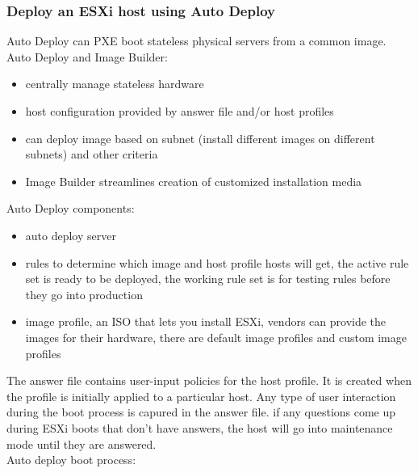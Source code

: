 \subsubsection{Deploy an ESXi host using Auto Deploy}

Auto Deploy can PXE boot stateless physical servers from a common image.\\

Auto Deploy and Image Builder:

\begin{itemize}
\item centrally manage stateless hardware
\item host configuration provided by answer file and/or host profiles
\item can deploy image based on subnet (install different images on different
subnets) and other criteria
\item Image Builder streamlines creation of customized installation media
\end{itemize}

Auto Deploy components:

\begin{itemize}

\item auto deploy server

\item rules to determine which image and host profile hosts will get, the
active rule set is ready to be deployed, the working rule set is for testing
rules before they go into production

\item image profile, an ISO that lets you install ESXi, vendors can provide the
images for their hardware, there are default image profiles and custom image
profiles

\end{itemize}

The answer file contains user-input policies for the host profile. It is
created when the profile is initially applied to a particular host. Any type
of user interaction during the boot process is capured in the answer file.
if any questions come up during ESXi boots that don't have answers, the host
will go into maintenance mode until they are answered.\\

Auto deploy boot process:

